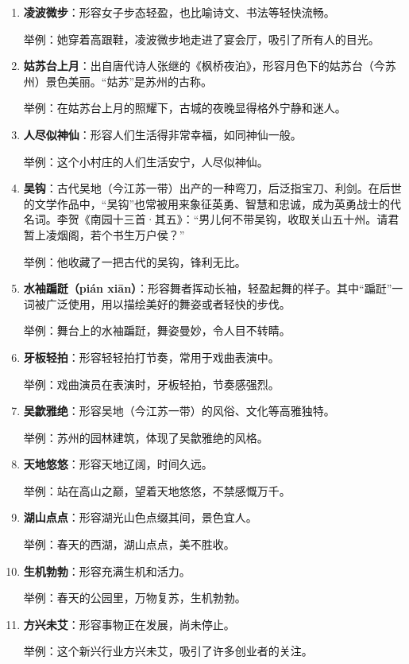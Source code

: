 \begin{enumerate}[leftmargin=*]
    举例：秋天的夜晚，独自漫步在枫桥边，仿佛能感受到“枫桥夜泊”的意境。
    
    \item \textbf{凌波微步}：形容女子步态轻盈，也比喻诗文、书法等轻快流畅。
    
    举例：她穿着高跟鞋，凌波微步地走进了宴会厅，吸引了所有人的目光。
    
    \item \textbf{姑苏台上月}：出自唐代诗人张继的《枫桥夜泊》，形容月色下的姑苏台（今苏州）景色美丽。“姑苏”是苏州的古称。
    
    举例：在姑苏台上月的照耀下，古城的夜晚显得格外宁静和迷人。
    
    \item \textbf{人尽似神仙}：形容人们生活得非常幸福，如同神仙一般。
    
    举例：这个小村庄的人们生活安宁，人尽似神仙。
    
    \item \textbf{吴钩}：古代吴地（今江苏一带）出产的一种弯刀，后泛指宝刀、利剑。在后世的文学作品中，“吴钩”也常被用来象征英勇、智慧和忠诚，成为英勇战士的代名词。李贺《南园十三首·其五》：“男儿何不带吴钩，收取关山五十州。请君暂上凌烟阁，若个书生万户侯？”
    
    举例：他收藏了一把古代的吴钩，锋利无比。
    
    \item \textbf{水袖蹁跹（pián xiān）}：形容舞者挥动长袖，轻盈起舞的样子。其中“蹁跹”一词被广泛使用，用以描绘美好的舞姿或者轻快的步伐。
    
    举例：舞台上的水袖蹁跹，舞姿曼妙，令人目不转睛。
    
    \item \textbf{牙板轻拍}：形容轻轻拍打节奏，常用于戏曲表演中。
    
    举例：戏曲演员在表演时，牙板轻拍，节奏感强烈。
    
    \item \textbf{吴歙雅绝}：形容吴地（今江苏一带）的风俗、文化等高雅独特。
    
    举例：苏州的园林建筑，体现了吴歙雅绝的风格。
    
    \item \textbf{天地悠悠}：形容天地辽阔，时间久远。
    
    举例：站在高山之巅，望着天地悠悠，不禁感慨万千。
    
    \item \textbf{湖山点点}：形容湖光山色点缀其间，景色宜人。
    
    举例：春天的西湖，湖山点点，美不胜收。
    
    \item \textbf{生机勃勃}：形容充满生机和活力。
    
    举例：春天的公园里，万物复苏，生机勃勃。
    
    \item \textbf{方兴未艾}：形容事物正在发展，尚未停止。
    
    举例：这个新兴行业方兴未艾，吸引了许多创业者的关注。
\end{enumerate}

